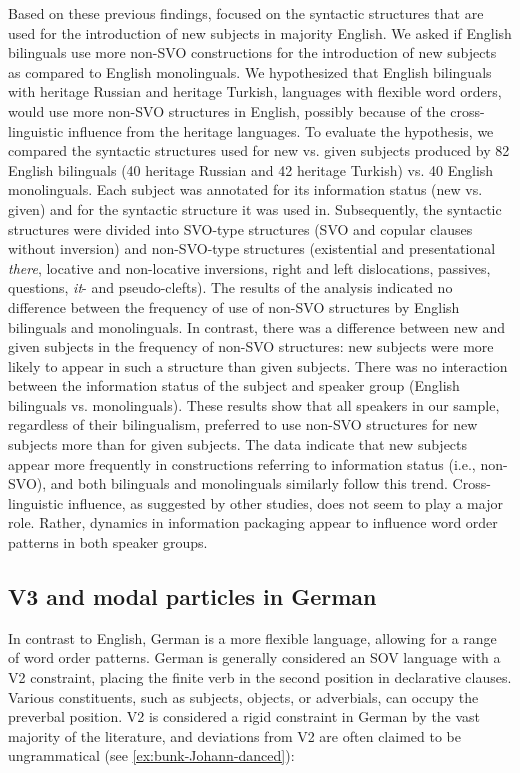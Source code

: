 \documentclass[output=paper,colorlinks,citecolor=brown]{langscibook}
\begin{document}
Based on these previous findings, \citet{pashkova_left_nodate} focused on the syntactic structures that are used for the introduction of new subjects in majority English. We asked if English bilinguals use more non-SVO constructions for the introduction of new subjects as compared to English monolinguals. We hypothesized that English bilinguals with heritage Russian and heritage Turkish, languages with flexible word orders, would use more non-SVO structures in English, possibly because of the cross-linguistic influence from the heritage languages. To evaluate the hypothesis, we compared the syntactic structures used for new vs. given subjects produced by 82 English bilinguals (40 heritage Russian and 42 heritage Turkish) vs. 40 English monolinguals. Each subject was annotated for its information status (new vs. given) and for the syntactic structure it was used in. Subsequently, the syntactic structures were divided into SVO-type structures (SVO and copular clauses without inversion) and non-SVO-type structures (existential and presentational \textit{there}, locative and non-locative inversions, right and left dislocations, passives, questions, \textit{it}- and pseudo-clefts). The results of the analysis indicated no difference between the frequency of use of non-SVO structures by English bilinguals and monolinguals. In contrast, there was a difference between new and given subjects in the frequency of non-SVO structures: new subjects were more likely to appear in such a structure than given subjects. There was no interaction between the information status of the subject and speaker group (English bilinguals vs. monolinguals). These results show that all speakers in our sample, regardless of their bilingualism, preferred to use non-SVO structures for new subjects more than for given subjects. The data indicate that new subjects appear more frequently in constructions referring to information status (i.e., non-SVO), and both bilinguals and monolinguals similarly follow this trend. Cross-linguistic influence, as suggested by other studies, does not seem to play a major role. Rather, dynamics in information packaging appear to influence word order patterns in both speaker groups. 

\subsection{V3 and modal particles in German}

In contrast to English, German is a more flexible language, allowing for a range of word order patterns. German is generally considered an SOV language with a V2 constraint, placing the finite verb in the second position in declarative clauses. Various constituents, such as subjects, objects, or adverbials, can occupy the preverbal position. V2 is considered a rigid constraint in German by the vast majority of the literature, and deviations from V2 are often claimed to be ungrammatical (see \ref{ex:bunk-Johann-danced}): 
\end{document}

